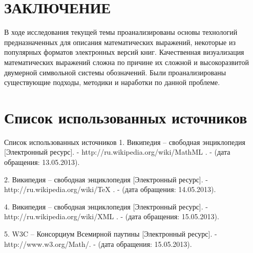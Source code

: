 \newpage
\chapter*{ЗАКЛЮЧЕНИЕ}

В ходе исследования текущей темы проанализированы основы технологий предназначенных для описания математических выражений, некоторые из популярных форматов электронных версий книг.
Качественная визуализация математических выражений сложна по причине их сложной и высокоразвитой двумерной символьной системы обозначений.
Были проанализированы существующие подходы, методики и наработки по данной проблеме.

\newpage
\chapter*{Список использованных источников}


Список использованных источников
1. Википедия – свободная энциклопедия [Электронный ресурс]. -  http://ru.wikipedia.org/wiki/MathML . - (дата обращения: 13.05.2013).

2. Википедия – свободная энциклопедия [Электронный ресурс]. -  http://ru.wikipedia.org/wiki/TeX . - (дата обращения: 14.05.2013).


4. Википедия – свободная энциклопедия [Электронный ресурс]. -  http://ru.wikipedia.org/wiki/XML . - (дата обращения: 15.05.2013).

5. W3C – Консорциум Всемирной паутины [Электронный ресурс]. -  http://www.w3.org/Math/. - (дата обращения: 15.05.2013).